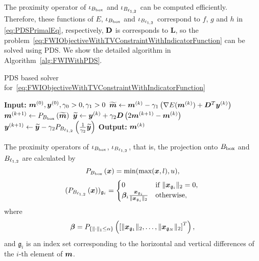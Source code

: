 The proximity operator of $\iota_{B_{\mathrm{box}}}$ and $\iota_{B_{\ell_{1,2}}}$ can be computed efficiently.
Therefore, these functions of $E$, $\iota_{B_{\mathrm{box}}}$ and $\iota_{B_{\ell_{1,2}}}$ correspond to $f$, $g$ and $h$ in \eqref{eq:PDSPrimalEq}, respectively, $\mathbf{D}$ is corresponds to $\bm{L}$, so the problem~\eqref{eq:FWIObjectiveWithTVConstraintWithIndicatorFunction} can be solved using PDS.
We show the detailed algorithm in Algorithm~\ref{alg:FWIWithPDS}.
\begin{algorithm}[t]
    \caption{PDS based solver for~\eqref{eq:FWIObjectiveWithTVConstraintWithIndicatorFunction}}\label{alg:FWIWithPDS}
    \begin{algorithmic}[1]
        \Statex \textbf{Input:} $ \bm{m}^{(0)}, \bm{y}^{(0)}, \gamma_0 > 0, \gamma_1 > 0 $
            \State $\widetilde{\bm{m}} \leftarrow \bm{m}^{(k)} - \gamma_1 \left( \nabla E(\bm{m}^{(k)}) + \bm{D}^T \bm{y}^{(k)} \right) $
            \State $\bm{m}^{(k+1)}     \leftarrow P_{B_{\mathrm{box}}} \left( \widetilde{\bm{m}} \right) $
            \State $\widetilde{\bm{y}}     \leftarrow \bm{y}^{(k)} + \gamma_2 \bm{D} \left( 2\bm{m}^{(k+1)} - \bm{m}^{(k)} \right) $
            \State $\bm{y}^{(k+1)}         \leftarrow \widetilde{\bm{y}} - \gamma_2 P_{B_{\ell_{1,2}}}\left(\frac 1 {\gamma_2} {\widetilde{\bm y}}\right) $
        \EndWhile
        \Statex \textbf{Output:} $\bm{m}^{(k)}$
    \end{algorithmic}
\end{algorithm}


The proximity operators of $\iota_{B_{\mathrm{box}}}$, $\iota_{B_{\ell_{1,2}}}$, that is, the projection onto $B_{\mathrm{box}}$ and ${B_{\ell_{1,2}}}$ are calculated by
\begin{equation} \label{eq:ProximityOperatorForBoxConstraint} \projBoxSolution, \end{equation}
\begin{equation} \label{eq:ProximityOperatorForL12Ball} \projLOneTwoBallSolution \end{equation}
where
\begin{equation} \label{eq:ProximityOperatorForL12BallWhere} \projLOneTwoBallSolutionWhere, \end{equation}
and $\mathfrak{g}_i$ is an index set corresponding to the horizontal and vertical differences of the $i$-th element of $\bm{m}$.

